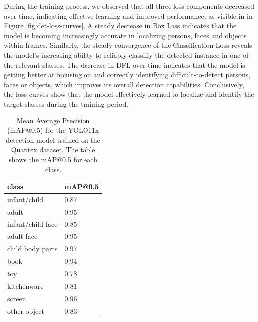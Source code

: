 \documentclass[
  man,floatsintext]{apa6}
\begin{document}
During the training process, we observed that all three loss components decreased over time, indicating effective learning and improved performance, as visible in in Figure \ref{fig:det-loss-curves}. A steady decrease in Box Loss indicates that the model is becoming increasingly accurate in localizing persons, faces and objects within frames. Similarly, the steady convergence of the Classification Loss reveals the model's increasing ability to reliably classifiy the detected instance in one of the relevant classes. The decrease in DFL over time indicates that the model is getting better at focusing on and correctly identifying difficult-to-detect persons, faces or objects, which improves its overall detection capabilities. Conclusively, the loss curves show that the model effectively learned to localize and identify the target classes during the training period.

\begin{table}[tbp]

\begin{center}
\begin{threeparttable}

\caption{\label{tab:det-map_all}Mean Average Precision (mAP@0.5) for the YOLO11x detection model trained on the Quantex dataset. The table shows the mAP@0.5 for each class.}

\begin{tabular}{ll}
\toprule
class & \multicolumn{1}{c}{mAP@0.5}\\
\midrule
infant/child & 0.87\\
adult & 0.95\\
infant/child face & 0.85\\
adult face & 0.95\\
child body parts & 0.97\\
book & 0.94\\
toy & 0.78\\
kitchenware & 0.81\\
screen & 0.96\\
other object & 0.83\\
\bottomrule
\end{tabular}

\end{threeparttable}
\end{center}

\end{table}
\end{document}
